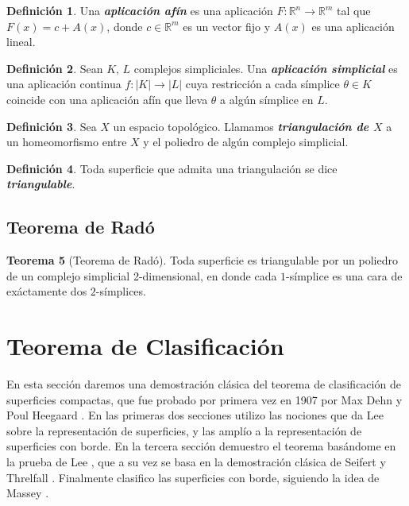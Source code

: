 \documentclass[10pt]{report}
\newcommand{\R}{\mathbb{R}}
\newcommand{\enfatiza}[1]{\textbf{\textit{#1}}}
\theoremstyle{definition}
\newtheorem{defin}{Definición}[section]
\newtheorem{tma}[defin]{Teorema}
\begin{document}
\begin{defin}
Una \enfatiza{aplicación afín} es una aplicación $F:\R^n \to \R^m$ tal que $F(x)=c+A(x)$, donde $c\in \R^m$ es un vector fijo y $A(x)$ es una aplicación lineal.
\end{defin}
\begin{defin}
Sean $K, \, L$ complejos simpliciales. Una \enfatiza{aplicación simplicial} es una aplicación continua $f:|K|\to |L|$ cuya restricción a cada símplice $\theta \in K$ coincide con una aplicación afín que lleva $\theta$ a algún símplice en $L$.
\end{defin}
\begin{defin}%
Sea $X$ un espacio topológico. Llamamos \enfatiza{triangulación de $X$} a un homeomorfismo entre $X$ y el poliedro de algún complejo simplicial.
\end{defin}

\begin{defin}%
Toda superficie que admita una triangulación se dice \enfatiza{triangulable}.
\end{defin}



\section{Teorema de Radó}

\begin{tma}[Teorema de Radó]
Toda superficie es triangulable por un poliedro de un complejo simplicial 2-dimensional, en donde cada $1$-símplice es una cara de exáctamente dos $2$-símplices.\label{teo:rado}
\end{tma}


\chapter{Teorema de Clasificación}
En esta sección daremos una demostración clásica del teorema de clasificación de superficies compactas, que fue probado por primera vez en 1907 por Max Dehn y Poul Heegaard \cite{dehn}. En las primeras dos secciones utilizo las nociones que da Lee \cite{lee1} sobre la representación de superficies, y las amplío a la representación de superficies con borde. En la tercera sección demuestro el teorema basándome en la prueba de Lee \cite{lee1}, que a su vez se basa en la demostración clásica de Seifert y Threlfall \cite{seifert}. Finalmente clasifico las superficies con borde, siguiendo la idea de Massey \cite{massey}.
\end{document}
